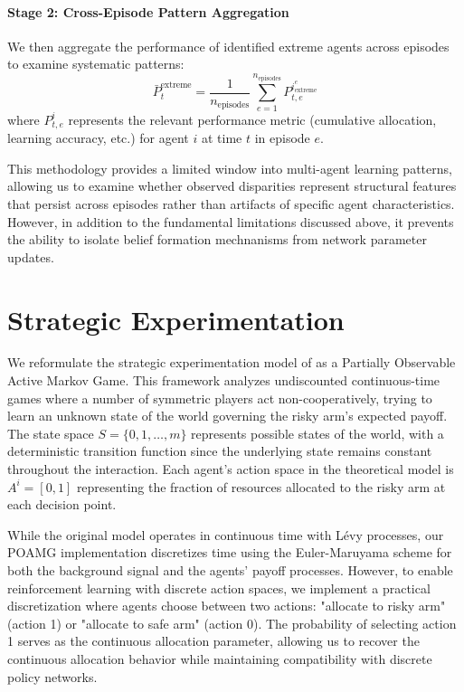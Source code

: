 \paragraph{Stage 2: Cross-Episode Pattern Aggregation} We then aggregate the performance of identified extreme agents across episodes to examine systematic patterns:
\begin{equation}
    \bar{P}_t^{\text{extreme}} = \frac{1}{n_{\text{episodes}}} \sum_{e=1}^{n_{\text{episodes}}} P_{t,e}^{i_{\text{extreme}}^e}
\end{equation}
where $P_{t,e}^i$ represents the relevant performance metric (cumulative allocation, learning accuracy, etc.) for agent $i$ at time $t$ in episode $e$.

This methodology provides a limited window into multi-agent learning patterns, allowing us to examine whether observed disparities represent structural features that persist across episodes rather than artifacts of specific agent characteristics. However, in addition to the fundamental limitations discussed above, it prevents the ability to isolate belief formation mechnanisms from network parameter updates.


\section{Strategic Experimentation}

We reformulate the strategic experimentation model of \citet{keller2020undiscounted} as a Partially Observable Active Markov Game. This framework analyzes undiscounted continuous-time games where a number of symmetric players act non-cooperatively, trying to learn an unknown state of the world governing the risky arm's expected payoff. The state space $S = \{0,1,\ldots,m\}$ represents possible states of the world, with a deterministic transition function since the underlying state remains constant throughout the interaction. Each agent's action space in the theoretical model is $A^i = [0,1]$ representing the fraction of resources allocated to the risky arm at each decision point.

While the original model operates in continuous time with Lévy processes, our POAMG implementation discretizes time using the Euler-Maruyama scheme \citep{kloeden1992numerical, platen1999introduction} for both the background signal and the agents' payoff processes. However, to enable reinforcement learning with discrete action spaces, we implement a practical discretization where agents choose between two actions: "allocate to risky arm" (action 1) or "allocate to safe arm" (action 0). The probability of selecting action 1 serves as the continuous allocation parameter, allowing us to recover the continuous allocation behavior while maintaining compatibility with discrete policy networks.

